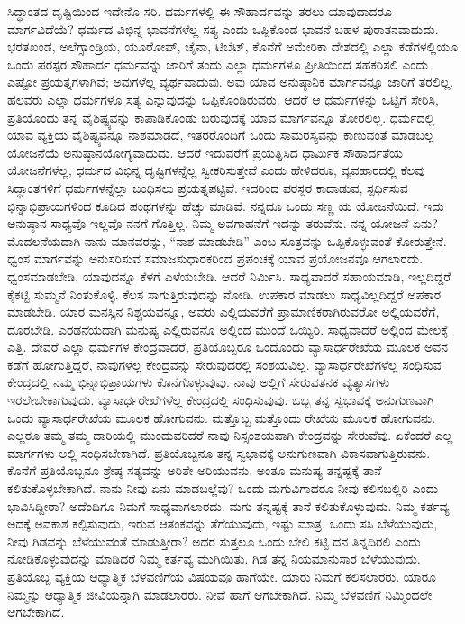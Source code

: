 ಸಿದ್ಧಾಂತದ ದೃಷ್ಟಿಯಿಂದ ಇದೇನೊ ಸರಿ. ಧರ್ಮಗಳಲ್ಲಿ ಈ ಸೌಹಾರ್ದವನ್ನು ತರಲು ಯಾವುದಾದರೂ ಮಾರ್ಗವಿದೆಯೆ? ಧರ್ಮದ ವಿಭಿನ್ನ ಭಾವನೆಗಳೆಲ್ಲ ಸತ್ಯ ಎಂದು ಒಪ್ಪಿಕೊಂಡ ಭಾವನೆ ಬಹಳ ಪುರಾತನವಾದುದು. ಭರತಖಂಡ, ಅಲೆಗ್ಸಾಂಡ್ರಿಯ, ಯೂರೋಪ್​, ಚೈನಾ, ಟಿಬೆಟ್​, ಕೊನೆಗೆ ಅಮೇರಿಕಾ ದೇಶದಲ್ಲಿ ಎಲ್ಲಾ ಕಡೆಗಳಲ್ಲಿಯೂ ಒಂದು ಪರಸ್ಪರ ಸೌಹಾರ್ದ ಧರ್ಮವನ್ನು ಜಾರಿಗೆ ತಂದು ಎಲ್ಲಾ ಧರ್ಮಗಳೂ ಪ್ರೀತಿಯಿಂದ ಸಹಕರಿಸಲಿ ಎಂದು ಎಷ್ಟೋ ಪ್ರಯತ್ನಗಳಾಗಿವೆ; ಅವುಗಳೆಲ್ಲ ವ್ಯರ್ಥವಾದುವು. ಅವು ಯಾವ ಅನುಷ್ಠಾನಿಕ ಮಾರ್ಗವನ್ನೂ ಜಾರಿಗೆ ತರಲಿಲ್ಲ. ಹಲವರು ಎಲ್ಲಾ ಧರ್ಮಗಳೂ ಸತ್ಯ ಎನ್ನುವುದನ್ನು ಒಪ್ಪಿಕೊಂಡಿರುವರು. ಆದರೆ ಆ ಧರ್ಮಗಳನ್ನು ಒಟ್ಟಿಗೆ ಸೇರಿಸಿ, ಪ್ರತಿಯೊಂದು ತನ್ನ ವೈಶಿಷ್ಟ್ಯವನ್ನು ಕಾಪಾಡಿಕೊಂಡು ಬರುವುದಕ್ಕೆ ಯಾವ ಮಾರ್ಗವನ್ನೂ ತೋರಲಿಲ್ಲ. ಧರ್ಮದಲ್ಲಿ ಯಾವ ವ್ಯಕ್ತಿಯ ವೈಶಿಷ್ಟ್ಯವನ್ನೂ ನಾಶಮಾಡದೆ, ಇತರರೊಂದಿಗೆ ಒಂದು ಸಾಮರಸ್ಯವನ್ನು ಕಾಣುವಂತೆ ಮಾಡಬಲ್ಲ ಯೋಜನೆಯೆ ಅನುಷ್ಠಾನಯೋಗ್ಯವಾದುದು. ಆದರೆ ಇದುವರೆಗೆ ಪ್ರಯತ್ನಿಸಿದ ಧಾರ್ಮಿಕ ಸೌಹಾರ್ದತೆಯ ಯೋಜನೆಗಳೆಲ್ಲ, ಧರ್ಮದ ವಿಭಿನ್ನ ದೃಷ್ಟಿಗಳನ್ನೆಲ್ಲ ಸ್ವೀಕರಿಸುತ್ತೇವೆ ಎಂದು ಹೇಳಿದರೂ, ವ್ಯವಹಾರದಲ್ಲಿ ಕೆಲವು ಸಿದ್ಧಾಂತಗಳಿಗೆ ಧರ್ಮಗಳನ್ನೆಲ್ಲಾ ಬಂಧಿಸಲು ಪ್ರಯತ್ನಪಟ್ಟಿವೆ. ಇದರಿಂದ ಪರಸ್ಪರ ಕಾದಾಡುವ, ಸ್ಪರ್ಧಿಸುವ ಭಿನ್ನಾಭಿಪ್ರಾಯಗಳಿಂದ ಕೂಡಿದ ಪಂಥಗಳನ್ನು ಹೆಚ್ಚು ಮಾಡಿವೆ. ನನ್ನದೂ ಒಂದು ಸಣ್ಣ ಯ ಯೋಜನೆಯಿದೆ. ಇದು ಅನುಷ್ಠಾನ ಸಾಧ್ಯವೊ ಇಲ್ಲವೊ ನನಗೆ ಗೊತ್ತಿಲ್ಲ. ನಿಮ್ಮ ಅವಗಾಹನೆಗೆ ಇದನ್ನು ತರುವೆನು. ನನ್ನ ಯೋಜನೆ ಏನು? ಮೊದಲನೆಯದಾಗಿ ನಾನು ಮಾನವರನ್ನು, “ನಾಶ ಮಾಡಬೇಡಿ” ಎಂಬ ಸೂತ್ರವನ್ನು ಒಪ್ಪಿಕೊಳ್ಳುವಂತೆ ಕೋರುತ್ತೇನೆ. ಧ್ವಂಸ ಮಾರ್ಗವನ್ನು ಅನುಸರಿಸುವ ಸಮಾಜಸುಧಾರಕರಿಂದ ಪ್ರಪಂಚಕ್ಕೆ ಯಾವ ಪ್ರಯೋಜನವೂ ಆಗಲಾರದು. ಧ್ವಂಸಮಾಡಬೇಡಿ, ಯಾವುದನ್ನೂ ಕೆಳಗೆ ಎಳೆಯಬೇಡಿ. ಆದರೆ ನಿರ್ಮಿಸಿ. ಸಾಧ್ಯವಾದರೆ ಸಹಾಯಮಾಡಿ, ಇಲ್ಲದಿದ್ದರೆ ಕೈಕಟ್ಟಿ ಸುಮ್ಮನೆ ನಿಂತುಕೊಳ್ಳಿ. ಕೆಲಸ ಸಾಗುತ್ತಿರುವುದನ್ನು ನೋಡಿ. ಉಪಕಾರ ಮಾಡಲು ಸಾಧ್ಯವಿಲ್ಲದಿದ್ದರೆ ಅಪಕಾರ ಮಾಡಬೇಡಿ. ಯಾರ ಮನಸ್ಸಿನ ನಿಶ್ಚಯವನ್ನೂ, ಅವರು ಎಲ್ಲಿಯವರೆಗೆ ಪ್ರಾಮಾಣಿಕರಾಗಿರುವರೋ ಅಲ್ಲಿಯವರೆಗೆ, ದೂರಬೇಡಿ. ಎರಡನೆಯದಾಗಿ ಮನುಷ್ಯ ಎಲ್ಲಿರುವನೊ ಅಲ್ಲಿಂದ ಮುಂದೆ ಒಯ್ಯಿರಿ. ಸಾಧ್ಯವಾದರೆ ಅಲ್ಲಿಂದ ಮೇಲಕ್ಕೆ ಎತ್ತಿ. ದೇವರೆ ಎಲ್ಲಾ ಧರ್ಮಗಳ ಕೇಂದ್ರವಾದರೆ, ಪ್ರತಿಯೊಬ್ಬರೂ ಒಂದೊಂದು ವ್ಯಾಸಾರ್ಧರೇಖೆಯ ಮೂಲಕ ಅವನ ಕಡೆಗೆ ಹೋಗುತ್ತಿದ್ದರೆ, ನಾವುಗಳೆಲ್ಲ ಕೇಂದ್ರವನ್ನು ಸೇರುವುದರಲ್ಲಿ ಸಂಶಯವಿಲ್ಲ. ವ್ಯಾಸಾರ್ಧರೇಖೆಗಳೆಲ್ಲ ಸಂಧಿಸುವ ಕೇಂದ್ರದಲ್ಲಿ ನಮ್ಮ ಭಿನ್ನಾಭಿಪ್ರಾಯಗಳು ಕೊನೆಗೊಳ್ಳುವುವು. ನಾವು ಅಲ್ಲಿಗೆ ಸೇರುವತನಕ ವ್ಯತ್ಯಾಸಗಳು ಇರಲೇಬೇಕಾಗುವುದು. ವ್ಯಾಸಾರ್ಧರೇಖೆಗಳೆಲ್ಲ ಕೇಂದ್ರದಲ್ಲಿ ಸಂಧಿಸುವುವು. ಒಬ್ಬ ತನ್ನ ಸ್ವಭಾವಕ್ಕೆ ಅನುಗುಣವಾಗಿ ಒಂದು ವ್ಯಾಸಾರ್ಧರೇಖೆಯ ಮೂಲಕ ಹೋಗುವನು. ಮತ್ತೊಬ್ಬ ಮತ್ತೊಂದು ರೇಖೆಯ ಮೂಲಕ ಹೋಗುವನು. ಎಲ್ಲರೂ ತಮ್ಮ ತಮ್ಮ ದಾರಿಯಲ್ಲಿ ಮುಂದುವರಿದರೆ ನಾವು ನಿಸ್ಸಂಶಯವಾಗಿ ಕೇಂದ್ರವನ್ನು ಸೇರುವೆವು. ಏಕೆಂದರೆ ಎಲ್ಲ ಮಾರ್ಗಗಳು ಅಲ್ಲಿ ಸಂಧಿಸಬೇಕಾಗಿದೆ. ಪ್ರತಿಯೊಬ್ಬನೂ ತನ್ನ ಸ್ವಭಾವಕ್ಕೆ ಅನುಗುಣವಾಗಿ ವಿಕಾಸವಾಗುತ್ತಿರುವನು. ಕೊನೆಗೆ ಪ್ರತಿಯೊಬ್ಬನೂ ಶ್ರೇಷ್ಠ ಸತ್ಯವನ್ನು ಅರಿತೇ ಅರಿಯುವನು. ಅಂತೂ ಮನುಷ್ಯ ತನ್ನಷ್ಟಕ್ಕೆ ತಾನೆ ಕಲಿತುಕೊಳ್ಳಬೇಕಾಗಿದೆ. ನಾನು ನೀವು ಏನು ಮಾಡಬಲ್ಲೆವು? ಒಂದು ಮಗುವಿಗಾದರೂ ನೀವು ಕಲಿಸಬಲ್ಲಿರಿ ಎಂದು ಭಾವಿಸಿದ್ದೀರಾ? ಅದೆಂದಿಗೂ ನಿಮಗೆ ಸಾಧ್ಯವಾಗಲಾರದು. ಮಗು ತನ್ನಷ್ಟಕ್ಕೆ ತಾನೆ ಕಲಿತುಕೊಳ್ಳುವುದು. ನಿಮ್ಮ ಕರ್ತವ್ಯ ಅದಕ್ಕೆ ಅವಕಾಶ ಕಲ್ಪಿಸುವುದು, ಇರುವ ಆತಂಕವನ್ನು ತೆಗೆಯುವುದು, ಇಷ್ಟು ಮಾತ್ರ. ಒಂದು ಸಸಿ ಬೆಳೆಯುವುದು, ನೀವು ಗಿಡವನ್ನು ಬೆಳೆಯುವಂತೆ ಮಾಡುತ್ತೀರಾ? ಅದರ ಸುತ್ತಲೂ ಒಂದು ಬೇಲಿ ಕಟ್ಟಿ ದನ ತಿನ್ನದಿರಲಿ ಎಂದು ನೋಡಿಕೊಳ್ಳುವುದನ್ನು ಮಾಡಿದರೆ ನಿಮ್ಮ ಕರ್ತವ್ಯ ಮುಗಿಯಿತು. ಗಿಡ ತನ್ನ ನಿಯಮಾನುಸಾರ ಬೆಳೆಯುವುದು. ಪ್ರತಿಯೊಬ್ಬ ವ್ಯಕ್ತಿಯ ಆಧ್ಯಾತ್ಮಿಕ ಬೆಳವಣಿಗೆಯ ವಿಷಯವೂ ಹಾಗೆಯೇ. ಯಾರು ನಿಮಗೆ ಕಲಿಸಲಾರರು. ಯಾರೂ ನಿಮ್ಮನ್ನು ಆಧ್ಯಾತ್ಮಿಕ ಜೀವಿಯನ್ನಾಗಿ ಮಾಡಲಾರರು. ನೀವೆ ಹಾಗೆ ಆಗಬೇಕಾಗಿದೆ. ನಿಮ್ಮ ಬೆಳವಣಿಗೆ ನಿಮ್ಮಿಂದಲೇ ಆಗಬೇಕಾಗಿದೆ.

